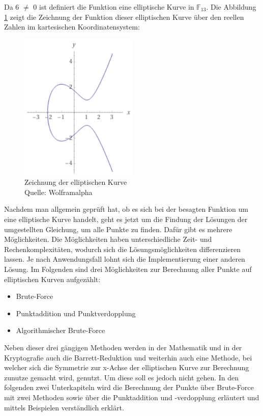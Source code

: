 Da 6 $\neq$ 0 ist definiert die Funktion eine elliptische Kurve in $\mathbb{F}_{13}$. Die Abbildung \ref{fig:kurve_beispiel_1_punktberechnung} zeigt die Zeichnung der Funktion dieser elliptischen Kurve über den reellen Zahlen im kartesischen Koordinatensystem: 

\begin{figure}[H]
    \centering
    \includegraphics[width=0.5\textwidth]{grafiken/kurve_beispiel_1_punktberechnung.png}
    \caption[Zeichnung der elliptischen Kurve]{Zeichnung der elliptischen Kurve \\ Quelle: Wolframalpha}
    \label{fig:kurve_beispiel_1_punktberechnung}
\end{figure}

Nachdem man allgemein geprüft hat, ob es sich bei der besagten Funktion um eine elliptische Kurve handelt, geht es jetzt um die Findung der Lösungen der umgestellten Gleichung, um alle Punkte zu finden. Dafür gibt es mehrere Möglichkeiten. Die Möglichkeiten haben unterschiedliche Zeit- und Rechenkomplexitäten, wodurch sich die Lösungsmöglichkeiten differenzieren lassen. Je nach Anwendungsfall lohnt sich die Implementierung einer anderen Lösung. Im Folgenden sind drei Möglichkeiten zur Berechnung aller Punkte auf elliptischen Kurven aufgezählt:

\begin{itemize}
\item Brute-Force
\item Punktaddition und Punktverdopplung
\item Algorithmischer Brute-Force
\end{itemize}

Neben dieser drei gängigen Methoden werden in der Mathematik und in der Kryptografie auch die Barrett-Reduktion und weiterhin auch eine Methode, bei welcher sich die Symmetrie zur x-Achse der elliptischen Kurve zur Berechnung zunutze gemacht wird, genutzt. Um diese soll es jedoch nicht gehen. In den folgenden zwei Unterkapiteln wird die Berechnung der Punkte über Brute-Force mit zwei Methoden sowie über die Punktaddition und -verdopplung erläutert und mittels Beispielen verständlich erklärt.

